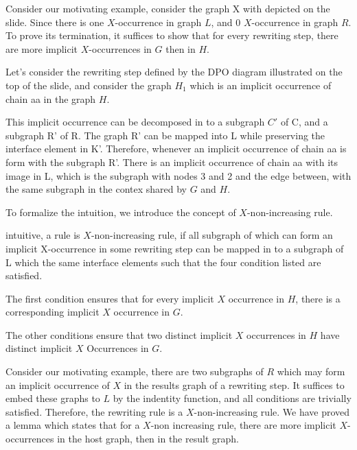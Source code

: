 

Consider our motivating example, consider the graph X with depicted on the slide. Since there is one $X$-occurrence in graph $L$, and 0 $X$-occurrence in graph $R$. To prove its termination, it suffices to show that for every rewriting step, there are more implicit $X$-occurrences in $G$ then in $H$.

Let's consider the rewriting step defined by the DPO diagram illustrated on the top of the slide, and consider the graph $H_1$ which is an implicit occurrence of chain aa in the graph $H$.

This implicit occurrence can be decomposed in to a subgraph $C'$ of C, and a subgraph R' of R. The graph R' can be mapped into L while preserving the interface element in K'. Therefore, whenever an implicit occurrence of chain aa is form with the subgraph R'. There is an implicit occurrence of chain aa with its image in L, which is the subgraph with nodes 3 and 2 and the edge between, with the same subgraph in the contex shared by $G$ and $H$.

To formalize the intuition, we introduce the concept of $X$-non-increasing rule.

intuitive, a rule is $X$-non-increasing rule, if all subgraph of which can form an implicit X-occurrence in some rewriting step can be mapped in to a subgraph of L which the same interface elements such that the four condition listed are satisfied.

The first condition ensures that for every implicit $X$ occurrence in $H$, there is a corresponding implicit $X$ occurrence in $G$. 

The other conditions ensure that two distinct implicit $X$ occurrences in $H$ have distinct implicit $X$ Occurrences in $G$.

Consider our motivating example, there are two subgraphs of $R$ which may form an implicit occurrence of $X$ in the results graph of a rewriting step. It suffices to embed these graphs to $L$ by the indentity function, and all conditions are trivially satisfied. Therefore, the rewriting rule is a $X$-non-increasing rule.
We have proved a lemma which states that for a $X$-non increasing rule, there are more implicit $X$-occurrences in the host graph, then in the result graph.

